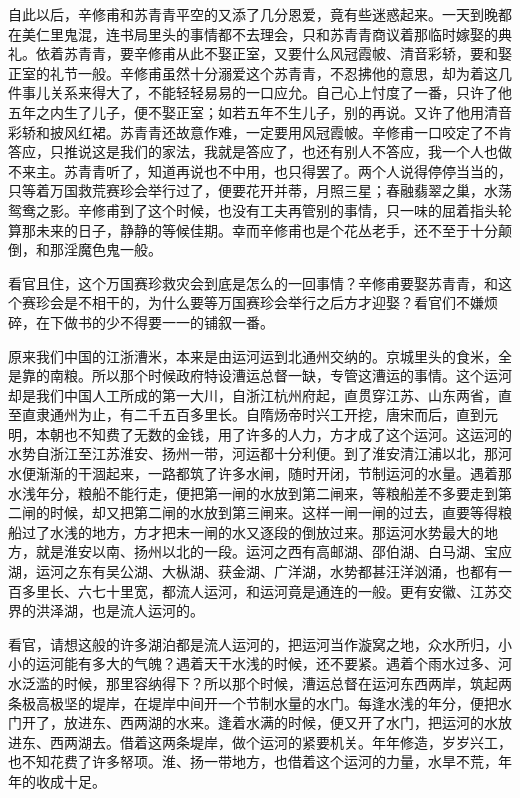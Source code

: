 \documentclass[12pt,UTF8]{ctexbook}
\begin{document}
{{{自此以后，辛修甫和苏青青平空的又添了几分恩爱，竟有些迷惑起来。一天到晚都在美仁里鬼混，连书局里头的事情都不去理会，只和苏青青商议着那临时嫁娶的典礼。依着苏青青，要辛修甫从此不娶正室，又要什么风冠霞帔、清音彩轿，要和娶正室的礼节一般。辛修甫虽然十分溺爱这个苏青青，不忍拂他的意思，却为着这几件事儿关系来得大了，不能轻轻易易的一口应允。自己心上忖度了一番，只许了他五年之内生了儿子，便不娶正室；如若五年不生儿子，别的再说。又许了他用清音彩轿和披风红裙。苏青青还故意作难，一定要用风冠霞帔。辛修甫一口咬定了不肯答应，只推说这是我们的家法，我就是答应了，也还有别人不答应，我一个人也做不来主。苏青青听了，知道再说也不中用，也只得罢了。两个人说得停停当当的，只等着万国救荒赛珍会举行过了，便要花开并蒂，月照三星；春融翡翠之巢，水荡鸳鸯之影。辛修甫到了这个时候，也没有工夫再管别的事情，只一味的屈着指头轮算那未来的日子，静静的等候佳期。幸而辛修甫也是个花丛老手，还不至于十分颠倒，和那淫魔色鬼一般。

看官且住，这个万国赛珍救灾会到底是怎么的一回事情？辛修甫要娶苏青青，和这个赛珍会是不相干的，为什么要等万国赛珍会举行之后方才迎娶？看官们不嫌烦碎，在下做书的少不得要一一的铺叙一番。

原来我们中国的江浙漕米，本来是由运河运到北通州交纳的。京城里头的食米，全是靠的南粮。所以那个时候政府特设漕运总督一缺，专管这漕运的事情。这个运河却是我们中国人工所成的第一大川，自浙江杭州府起，直贯穿江苏、山东两省，直至直隶通州为止，有二千五百多里长。自隋炀帝时兴工开挖，唐宋而后，直到元明，本朝也不知费了无数的金钱，用了许多的人力，方才成了这个运河。这运河的水势自浙江至江苏淮安、扬州一带，河运都十分利便。到了淮安清江浦以北，那河水便渐渐的干涸起来，一路都筑了许多水闸，随时开闭，节制运河的水量。遇着那水浅年分，粮船不能行走，便把第一闸的水放到第二闸来，等粮船差不多要走到第二闸的时候，却又把第二闸的水放到第三闸来。这样一闸一闸的过去，直要等得粮船过了水浅的地方，方才把末一闸的水又逐段的倒放过来。那运河水势最大的地方，就是淮安以南、扬州以北的一段。运河之西有高邮湖、邵伯湖、白马湖、宝应湖，运河之东有吴公湖、大枞湖、获金湖、广洋湖，水势都甚汪洋汹涌，也都有一百多里长、六七十里宽，都流人运河，和运河竟是通连的一般。更有安徽、江苏交界的洪泽湖，也是流人运河的。

看官，请想这般的许多湖泊都是流人运河的，把运河当作漩窝之地，众水所归，小小的运河能有多大的气魄？遇着天干水浅的时候，还不要紧。遇着个雨水过多、河水泛滥的时候，那里容纳得下？所以那个时候，漕运总督在运河东西两岸，筑起两条极高极坚的堤岸，在堤岸中间开一个节制水量的水门。每逢水浅的年分，便把水门开了，放进东、西两湖的水来。逢着水满的时候，便又开了水门，把运河的水放进东、西两湖去。借着这两条堤岸，做个运河的紧要机关。年年修造，岁岁兴工，也不知花费了许多帑项。淮、扬一带地方，也借着这个运河的力量，水旱不荒，年年的收成十足。

}}}
\end{document}
